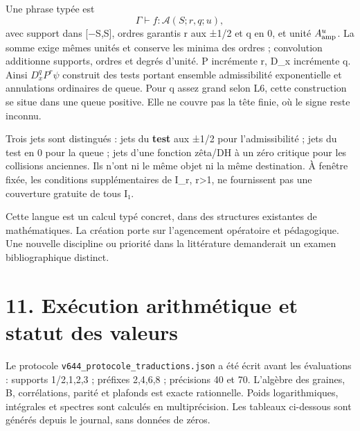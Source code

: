 \documentclass[
  10pt,
  a4paper,
]{article}
\begin{document}
Une phrase typée est \[
\Gamma\vdash f:\mathcal A(S;r,q;u),
\] avec support dans {[}−S,S{]}, ordres garantis r aux ±1/2 et q en 0,
et unité \(A_{\rm amp}^{u}\). La somme exige mêmes unités et conserve
les minima des ordres ; convolution additionne supports, ordres et
degrés d'unité. P incrémente r, D\_x incrémente q. Ainsi
\(D_x^qP^r\psi\) construit des tests portant ensemble admissibilité
exponentielle et annulations ordinaires de queue. Pour q assez grand
selon L6, cette construction se situe dans une queue positive. Elle ne
couvre pas la tête finie, où le signe reste inconnu.

Trois jets sont distingués : jets du \textbf{test} aux ±1/2 pour
l'admissibilité ; jets du test en 0 pour la queue ; jets d'une fonction
zêta/DH à un zéro critique pour les collisions anciennes. Ils n'ont ni
le même objet ni la même destination. À fenêtre fixée, les conditions
supplémentaires de I\_r, r\textgreater1, ne fournissent pas une
couverture gratuite de tous I₁.

Cette langue est un calcul typé concret, dans des structures existantes
de mathématiques. La création porte sur l'agencement opératoire et
pédagogique. Une nouvelle discipline ou priorité dans la littérature
demanderait un examen bibliographique distinct.

\hypertarget{exuxe9cution-arithmuxe9tique-et-statut-des-valeurs}{%
\section{11. Exécution arithmétique et statut des
valeurs}\label{exuxe9cution-arithmuxe9tique-et-statut-des-valeurs}}

Le protocole \texttt{v644\_protocole\_traductions.json} a été écrit
avant les évaluations : supports 1/2,1,2,3 ; préfixes 2,4,6,8 ;
précisions 40 et 70. L'algèbre des graines, B, corrélations, parité et
plafonds est exacte rationnelle. Poids logarithmiques, intégrales et
spectres sont calculés en multiprécision. Les tableaux ci-dessous sont
générés depuis le journal, sans données de zéros.
\end{document}

